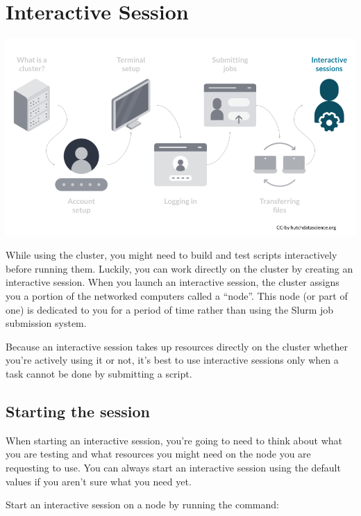 \documentclass[
]{book}
\begin{document}
\hypertarget{interactive-session}{%
\chapter{Interactive Session}\label{interactive-session}}

\begin{center}\includegraphics[width=0.8\linewidth]{resources/images/09-interactive_files/figure-latex//1BQxrVYdKZTbpCaF-i_q9w7s9x034lEXpQZDU-Sl09cs_gff2211b72f_1_275} \end{center}

While using the cluster, you might need to build and test scripts interactively before running them. Luckily, you can work directly on the cluster by creating an interactive session. When you launch an interactive session, the cluster assigns you a portion of the networked computers called a ``node''. This node (or part of one) is dedicated to you for a period of time rather than using the Slurm job submission system.

Because an interactive session takes up resources directly on the cluster whether you're actively using it or not, it's best to use interactive sessions only when a task cannot be done by submitting a script.

\hypertarget{starting-the-session}{%
\section{Starting the session}\label{starting-the-session}}

When starting an interactive session, you're going to need to think about what you are testing and what resources you might need on the node you are requesting to use. You can always start an interactive session using the default values if you aren't sure what you need yet.

Start an interactive session on a node by running the command:
\end{document}
